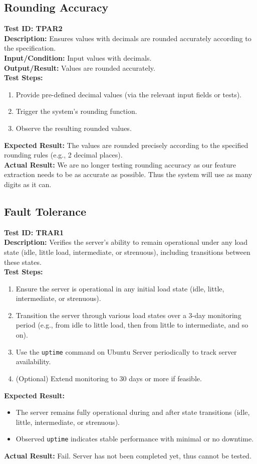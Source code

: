 \documentclass[12pt, titlepage]{article}
\begin{document}
\subsection{Rounding Accuracy}
\textbf{Test ID: TPAR2}\\
\textbf{Description:} Ensures values with decimals are rounded accurately according to the specification.\\
\textbf{Input/Condition:} Input values with decimals.\\
\textbf{Output/Result:} Values are rounded accurately.\\
\textbf{Test Steps:}
\begin{enumerate}
    \item Provide pre-defined decimal values (via the relevant input fields or tests).
    \item Trigger the system's rounding function.
    \item Observe the resulting rounded values.
\end{enumerate}
\textbf{Expected Result:} The values are rounded precisely according to the specified rounding rules (e.g., 2 decimal places).\\
\textbf{Actual Result:} We are no longer testing rounding accuracy as our feature extraction needs to be as accurate as possible. Thus the system will use as many digits as it can.

\subsection{Fault Tolerance}
\textbf{Test ID: TRAR1}\\
\textbf{Description:} Verifies the server's ability to remain operational under any load state (idle, little load, intermediate, or strenuous), including transitions between these states.\\
\textbf{Test Steps:}
\begin{enumerate}
    \item Ensure the server is operational in any initial load state (idle, little, intermediate, or strenuous).
    \item Transition the server through various load states over a 3-day monitoring period (e.g., from idle to little load, then from little to intermediate, and so on).
    \item Use the \texttt{uptime} command on Ubuntu Server periodically to track server availability.
    \item (Optional) Extend monitoring to 30 days or more if feasible.
\end{enumerate}
\textbf{Expected Result:}
\begin{itemize}
    \item The server remains fully operational during and after state transitions (idle, little, intermediate, or strenuous).
    \item Observed \texttt{uptime} indicates stable performance with minimal or no downtime.
\end{itemize}
\textbf{Actual Result:} Fail. Server has not been completed yet, thus cannot be tested.
\end{document}
